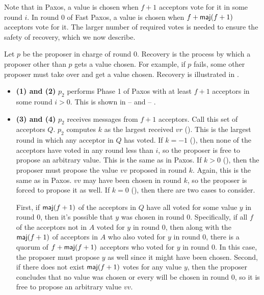 Note that in Paxos, a value is chosen when $f+1$ acceptors vote for it in some
round $i$. In round $0$ of Fast Paxos, a value is chosen when $f + \textsf{maj}(f+1)$
acceptors vote for it. The larger number of required votes is needed to ensure
the safety of recovery, which we now describe.

Let $p$ be the proposer in charge of round $0$. Recovery is the process by
which a proposer other than $p$ gets a value chosen. For example, if $p$ fails,
some other proposer must take over and get a value chosen. Recovery is
illustrated in .

\begin{itemize}
  \item \textbf{(1) and (2)}
    $p_2$ performs Phase 1 of Paxos with at least $f+1$ acceptors in some round
    $i > 0$. This is shown in 
     --  and
      --
    .

  \item \textbf{(3) and (4)}
    $p_2$ receives  messages from $f+1$ acceptors. Call
    this set of acceptors $Q$. $p_2$ computes $k$ as the largest received $vr$
    (). This is the largest round in which any acceptor in
    $Q$ has voted. If $k = -1$ (), then none of the acceptors have
    voted in any round less than $i$, so the proposer is free to propose an
    arbitrary value. This is the same as in Paxos. If $k > 0$ (),
    then the proposer must propose the value $vv$ proposed in round $k$. Again,
    this is the same as in Paxos. $vv$ may have been chosen in round $k$, so
    the proposer is forced to propose it as well. If $k = 0$ (),
    then there are two cases to consider.

    First, if $\textsf{maj}(f+1)$ of the acceptors in $Q$ have all voted for some value
    $y$ in round $0$, then it's possible that $y$ was chosen in round $0$.
    Specifically, if all $f$ of the acceptors not in $A$ voted for $y$ in round
    $0$, then along with the $\textsf{maj}(f+1)$ of acceptors in $A$ who also voted for
    $y$ in round $0$, there is a quorum of $f + \textsf{maj}(f+1)$ acceptors who voted
    for $y$ in round $0$. In this case, the proposer must propose $y$ as well
    since it might have been chosen. Second, if there does not exist
    $\textsf{maj}(f+1)$ votes for any value $y$, then the proposer concludes that no
    value was chosen or every will be chosen in round $0$, so it is free to
    propose an arbitrary value $vv$.


\end{itemize}
